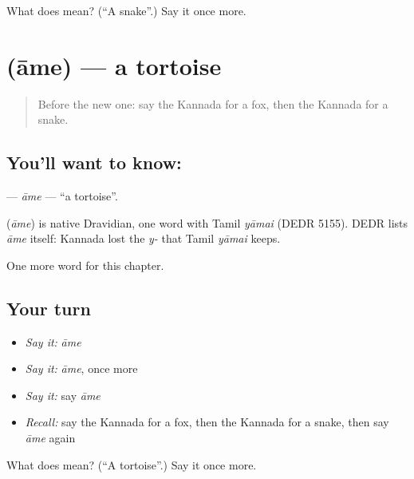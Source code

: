 \begin{tcolorbox}[breakable,colback=teal!4,colframe=teal!35!black,title={Before you move on}]
What does  mean? (\textquotedblleft{}A snake\textquotedblright{}.) Say it once more.
\end{tcolorbox}
\section[\texorpdfstring{\kn{ಆಮೆ} (āme)}{ಆಮೆ (āme)}]{ (āme) — a tortoise}

\label{lesson:KA-C131-ame}



\begin{quote}
Before the new one: say the Kannada for a fox, then the Kannada for a snake.
\end{quote}

\subsection*{You'll want to know: }
\textbf{} — \emph{āme} — \textquotedblleft{}a tortoise\textquotedblright{}.

\begin{cousinweb}
\textbf{} (\emph{āme}) is native Dravidian, one word with Tamil \emph{yāmai} (DEDR 5155). DEDR lists \emph{āme} itself: Kannada lost the \emph{y-} that Tamil \emph{yāmai} keeps.
\end{cousinweb}

\begin{grammarlens}[title={What you've built}]
One more word for this chapter.
\end{grammarlens}

\subsection*{Your turn}
\begin{itemize}
\raggedright
  \item \emph{Say it:} \emph{āme}
  \item \emph{Say it:} \emph{āme}, once more
  \item \emph{Say it:} say \emph{āme}
  \item \emph{Recall:} say the Kannada for a fox, then the Kannada for a snake, then say \emph{āme} again
\end{itemize}

\begin{tcolorbox}[breakable,colback=teal!4,colframe=teal!35!black,title={Before you move on}]
What does  mean? (\textquotedblleft{}A tortoise\textquotedblright{}.) Say it once more.
\end{tcolorbox}
